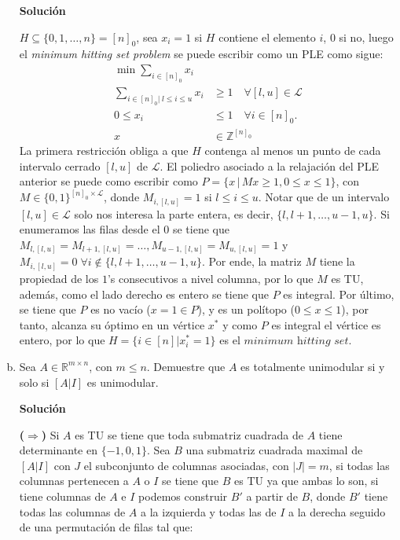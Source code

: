 \documentclass{article}
\newcommand{\RR}{\mathbb R}
\newcommand{\ZZ}{\mathbb Z}
\theoremstyle{plain}
\theoremstyle{definition}
\theoremstyle{Azul}
\begin{document}
\begin{enumerate}[(a)]
\textbf{Solución}

$H\subseteq \{0, 1, \ldots, n\} = [n]_0$, sea $x_{i}=1$ si $H$ contiene el elemento $i$, $0$ si no, luego el \textit{minimum hitting set problem} se puede escribir como un PLE como sigue:
\begin{align*}
    \min \sum_{i\in[n]_0}  x_{i}\\
    \sum_{i\in [n]_0|\;l\leq i\leq u}x_{i} & \geq 1\quad \forall [l,u] \in \mathcal{L}\\
    0\leq x_{i} &\leq 1 \quad \forall i\in [n]_0.\\
    x&\in \ZZ^{[n]_0}
\end{align*}
La primera restricción obliga a que $H$ contenga al menos un punto de cada intervalo cerrado $[l,u]$ de $\mathcal{L}$. El poliedro asociado a la relajación del PLE anterior se puede como escribir como $P = \{x\,|\, Mx\geq 1, 0\leq x\leq 1\}$, con $M\in \{0,1\}^{[n]_0\times\mathcal{L}}$, donde $M_{i,[l,u]}=1$ si $l\leq i\leq u$. Notar que de un intervalo $[l,u]\in \mathcal{L}$ solo nos interesa la parte entera, es decir, $\{l, l+1, \ldots, u-1, u\}$. Si enumeramos las filas desde el $0$ se tiene que $M_{l, [l,u]}=M_{l+1, [l,u]} = \ldots,M_{u-1, [l,u]}= M_{u, [l,u]}=1$ y $M_{i, [l,u]}=0 \; \forall i \notin \{l, l+1, \ldots, u-1, u\}$. Por ende, la matriz $M$ tiene la propiedad de los $1$'s consecutivos a nivel columna, por lo que $M$ es TU, además, como el lado derecho es entero se tiene que $P$ es integral. Por último, se tiene que $P$ es no vacío ($x=1\in P$), y es un polítopo ($0\leq x\leq 1$), por tanto, alcanza su óptimo en un vértice $x^{*}$ y como $P$ es integral el vértice es entero, por lo que $H=\{i\in[n]|x^{*}_{i}=1\}$ es el $\textit{minimum hitting set}$.

\item Sea $A\in \RR^{m\times n}$, con $m\leq n$. Demuestre que $A$ es totalmente unimodular si y solo si $[A | I]$ es unimodular.

\textbf{Solución}

\textbf{($\Longrightarrow$)} Si $A$ es TU se tiene que toda submatriz cuadrada de $A$ tiene determinante en $\{-1,0,1\}$. Sea $B$ una submatriz cuadrada maximal de $[A|I]$ con $J$ el subconjunto de columnas asociadas, con $|J|=m$, si todas las columnas pertenecen a $A$ o $I$ se tiene que $B$ es TU ya que ambas lo son, si tiene columnas de $A$ e $I$ podemos construir $B'$ a partir de $B$, donde $B'$ tiene todas las columnas de $A$ a la izquierda y todas las de $I$ a la derecha seguido de una permutación de filas tal que:


\end{enumerate}
\end{document}

